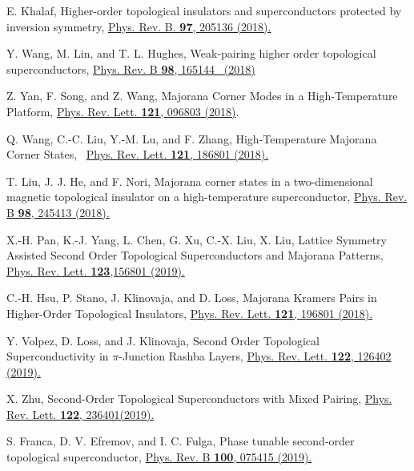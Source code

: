 \documentclass[twocolumn,prl,floatfix,citeautoscript,nofootinbib,superscriptaddress]{revtex4}
\begin{document}
\begin{thebibliography}{99}
 E. Khalaf, Higher-order topological insulators and
superconductors protected by inversion symmetry, \href{https://doi.org/10.1103/PhysRevB.97.205136}%
{Phys. Rev. B. \textbf{97}, 205136 (2018).}

 Y. Wang, M. Lin, and T. L. Hughes, Weak-pairing higher
order topological superconductors, \href{https://doi.org/10.1103/PhysRevB.98.165144}%
{Phys. Rev. B \textbf{98}, 165144 \ (2018)}

 Z. Yan, F. Song, and Z. Wang, Majorana Corner Modes in a
High-Temperature Platform, \href{https://doi.org/10.1103/PhysRevLett.121.096803}%
{Phys. Rev. Lett. \textbf{121}, 096803 (2018)}.

 Q. Wang, C.-C. Liu, Y.-M. Lu, and F. Zhang,
High-Temperature Majorana Corner States, \ \href{https://doi.org/10.1103/PhysRevLett.121.186801}%
{Phys. Rev. Lett. \textbf{121}, 186801 (2018).}

 T. Liu, J. J. He, and F. Nori, Majorana corner states in a
two-dimensional magnetic topological insulator on a high-temperature
superconductor, \href{https://doi.org/10.1103/PhysRevB.98.245413}{Phys. Rev.
B \textbf{98}, 245413 (2018).}

 X.-H. Pan, K.-J. Yang, L. Chen, G. Xu, C.-X. Liu, X. Liu,
Lattice Symmetry Assisted Second Order Topological Superconductors and
Majorana Patterns, \href{https://doi.org/10.1103/PhysRevLett.123.156801}{%
Phys. Rev. Lett. \textbf{123},156801 (2019).}

 C.-H. Hsu, P. Stano, J. Klinovaja, and D. Loss, Majorana
Kramers Pairs in Higher-Order Topological Insulators, \href{https://doi.org/10.1103/PhysRevLett.121.196801}%
{Phys. Rev. Lett. \textbf{121}, 196801 (2018).}

 Y. Volpez, D. Loss, and J. Klinovaja, Second Order
Topological Superconductivity in $\pi $-Junction Rashba Layers, \href{https://doi.org/10.1103/PhysRevLett.122.126402}%
{ Phys. Rev. Lett. \textbf{122}, 126402 (2019).}

 X. Zhu, Second-Order Topological Superconductors with
Mixed Pairing, \href{https://doi.org/10.1103/PhysRevLett.122.236401}{Phys.
Rev. Lett. \textbf{122}, 236401(2019).}

 S. Franca, D. V. Efremov, and I. C. Fulga, Phase
tunable second-order topological superconductor, \href{https://doi.org/10.1103/PhysRevB.100.075415}%
{ Phys. Rev. B \textbf{100}, 075415 (2019).}


\end{thebibliography}
\end{document}
